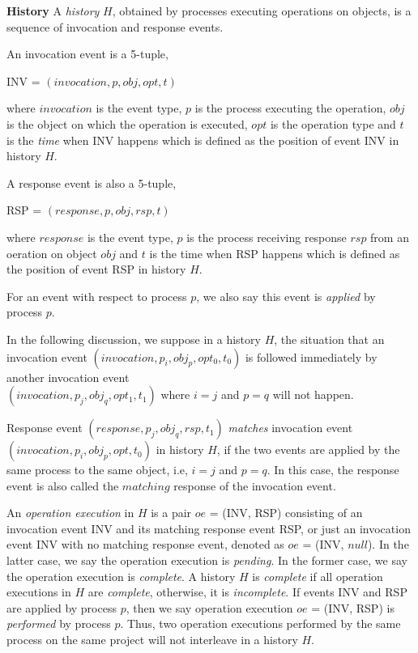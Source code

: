 \textbf{History}
A \emph{history} $H$, obtained by processes executing
operations on objects, is a sequence of invocation
and response events.

An invocation event is a 5-tuple,
\begin{center}
INV = $(invocation, p, obj, opt, t)$
\end{center}
where $invocation$ is the event type, $p$ is the process executing the operation, $obj$ is the object on which the operation
is executed, $opt$ is the operation type and $t$ is the \emph{time} when INV happens which is defined
as the position of event INV in history $H$.

A response event is also a 5-tuple,
\begin{center}
RSP = $(response, p, obj, rsp, t)$
\end{center}
where $response$ is the event type, $p$ is the process receiving response $rsp$ from an oeration on object $obj$ and $t$
is the time when RSP happens which is defined as the position of event RSP in history $H$.

For an event with respect to
process $p$, we also say this event is \emph{applied} by process $p$.

In the following discussion, we suppose in a history $H$, the situation that an invocation event
$(invocation, p_i, obj_p, opt_0, t_0)$ is followed immediately by another invocation event\\
$(invocation, p_j, obj_q, opt_1, t_1)$ where $i = j$ and $p = q$ will not happen.

Response event $(response, p_j, obj_q, rsp, t_1)$ \emph{matches} invocation event $(invocation, p_i, obj_p, opt, t_0)$
in history $H$, if the two events are applied by the same process to the same object, i.e, $i = j$ and $p = q$.
In this case, the response event is also called the $matching$ response of the invocation event.

An \emph{operation execution} in $H$ is a pair $oe$ = (INV, RSP) consisting of an invocation event INV
and its matching response event RSP, or just an invocation event INV with no matching response event,
denoted as $oe$ = (INV, $null$).
In the latter case, we say the operation execution is \emph{pending}. In the former case, we say the operation
execution is \emph{complete}. A history $H$ is \emph{complete} if all operation executions in $H$ are \emph{complete},
otherwise, it is \emph{incomplete}. If events INV and RSP are applied by process $p$, then we say
operation execution $oe$ = (INV, RSP) is \emph{performed} by process $p$. Thus, two operation
executions performed by the same process on the same project will not interleave in a history $H$.

